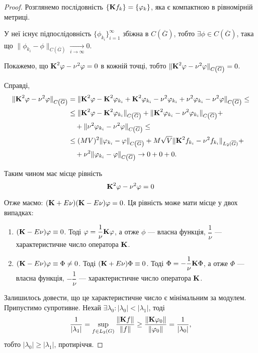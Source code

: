 \begin{proof}
	Розглянемо послідовність $\{ \bf{K}f_k \} = \{ \phi_k\}$, яка є компактною в рівномірній метриці. \medskip

	У неї існує підпослідовність $\{\phi_{k_i}\}_{i = 1}^\infty$ збіжна в $C\left(\overline G\right)$, тобто $\exists \phi \in C\left(\overline G\right)$, така що $\| \phi_{k_i} - \phi\|_{C\left(\overline G\right)} \xrightarrow[i \to \infty]{} 0$. \medskip

	Покажемо, що $\bf{K}^2 \phi - \nu^2 \phi = 0$ в кожній точці, тобто $\| \bf{K}^2\phi - \nu^2 \phi\|_{C\left(\overline G\right)} = 0$. \medskip

	Справді,
	\begin{equation}
		\begin{aligned}
			\|\bf{K}^2\phi - \nu^2\phi\|_{C\left(\overline G\right)} &= \|\bf{K}^2\phi - \bf{K}^2\phi_{k_i} + \bf{K}^2\phi_{k_i} - \nu^2\phi_{k_i} + \nu^2\phi_{k_i} - \nu^2\phi\|_{C\left(\overline G\right)} \le \\
			&\le \|\bf{K}^2\phi-\bf{K}^2\phi_{k_i}\|_{C\left(\overline G\right)} + \|\bf{K}^2\phi_{k_i}-\nu^2\phi_{k_i}\|_{C\left(\overline G\right)}+ \\
			&\quad + \|\nu^2\phi_{k_i}-\nu^2\phi\|_{C\left(\overline G\right)} \le \\
			&\le (MV)^2 \|\phi_{k_i} - \phi\|_{C\left(\overline G\right)} + M\sqrt{V} \|\bf{K}^2f_{k_i}-\nu^2f_{k_i}\|_{L_2(\overline G)} + \\
			&\quad + \nu^2 \|\phi_{k_i} - \phi\|_{C\left(\overline G\right)} \to 0 + 0 + 0.
		\end{aligned}
	\end{equation}
	
	Таким чином має місце рівність
	\begin{equation}
		\bf{K}^2 \phi - \nu^2 \phi = 0
	\end{equation}
	
	Отже маємо: $(\bf{K} + E\nu)(\bf{K} - E \nu)\phi=0$. Ця рівність може мати місце у двох випадках:
	\begin{enumerate}
		\item $(\bf{K} - E\nu) \phi \equiv 0$. Тоді $\phi = \dfrac{1}{\nu}\bf{K}\phi$, а отже $\phi$ --- власна функція, $\dfrac{1}{\nu}$ --- характеристичне число оператора $\bf{K}$.

		\item $(\bf{K} - E\nu) \phi \equiv \Phi \ne 0$. Тоді $(\bf{K} + E \nu) \Phi \equiv 0$. Тоді $\Phi = -\dfrac{1}{\nu}\bf{K}\Phi$, а отже $\Phi$ --- власна функція, $-\dfrac{1}{\nu}$ --- характеристичне число оператора $\bf{K}$.
	\end{enumerate}
	
	Залишилось довести, що це характеристичне число є мінімальним за модулем. Припустимо супротивне. Нехай $\exists \lambda_0: |\lambda_0| < |\lambda_1|$, тоді
	\begin{equation}
		\frac{1}{|\lambda_1|} = \sup_{f \in L_2(G)} \frac{\|\bf{K}f\|}{\|f\|} \ge \frac{\|\bf{K}\phi_0\|}{\|\phi_0\|} = \frac{1}{|\lambda_0|},
	\end{equation}
	тобто $|\lambda_0| \ge |\lambda_1|$, протиріччя.
\end{proof}

